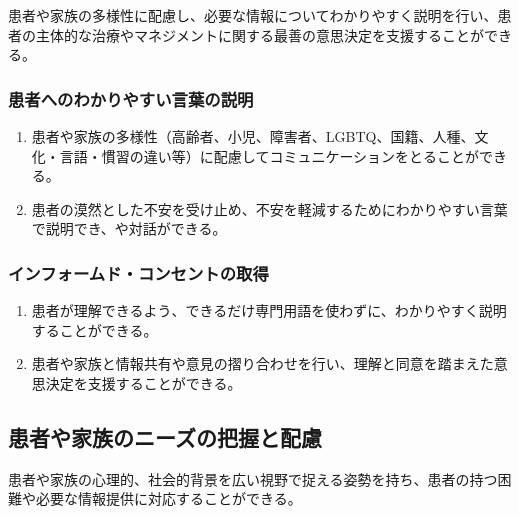 \documentclass[
]{ltjsarticle}
\providecommand{\tightlist}{%
  \setlength{\itemsep}{0pt}\setlength{\parskip}{0pt}}
\begin{document}
患者や家族の多様性に配慮し、必要な情報についてわかりやすく説明を行い、患者の主体的な治療やマネジメントに関する最善の意思決定を支援することができる。

\hypertarget{ux60a3ux8005ux3078ux306eux308fux304bux308aux3084ux3059ux3044ux8a00ux8449ux306eux8aacux660e}{%
\subsubsection{患者へのわかりやすい言葉の説明}\label{ux60a3ux8005ux3078ux306eux308fux304bux308aux3084ux3059ux3044ux8a00ux8449ux306eux8aacux660e}}

\begin{enumerate}
\def\labelenumi{\arabic{enumi}.}
\tightlist
\item
  患者や家族の多様性（高齢者、小児、障害者、LGBTQ、国籍、人種、文化・言語・慣習の違い等）に配慮してコミュニケーションをとることができる。
\item
  患者の漠然とした不安を受け止め、不安を軽減するためにわかりやすい言葉で説明でき、や対話ができる。
\end{enumerate}

\hypertarget{ux30a4ux30f3ux30d5ux30a9ux30fcux30e0ux30c9ux30b3ux30f3ux30bbux30f3ux30c8ux306eux53d6ux5f97}{%
\subsubsection{インフォームド・コンセントの取得}\label{ux30a4ux30f3ux30d5ux30a9ux30fcux30e0ux30c9ux30b3ux30f3ux30bbux30f3ux30c8ux306eux53d6ux5f97}}

\begin{enumerate}
\def\labelenumi{\arabic{enumi}.}
\tightlist
\item
  患者が理解できるよう、できるだけ専門用語を使わずに、わかりやすく説明することができる。
\item
  患者や家族と情報共有や意見の摺り合わせを行い、理解と同意を踏まえた意思決定を支援することができる。
\end{enumerate}

\hypertarget{ux60a3ux8005ux3084ux5bb6ux65cfux306eux30cbux30fcux30baux306eux628aux63e1ux3068ux914dux616e}{%
\subsection{患者や家族のニーズの把握と配慮}\label{ux60a3ux8005ux3084ux5bb6ux65cfux306eux30cbux30fcux30baux306eux628aux63e1ux3068ux914dux616e}}

患者や家族の心理的、社会的背景を広い視野で捉える姿勢を持ち、患者の持つ困難や必要な情報提供に対応することができる。
\end{document}
